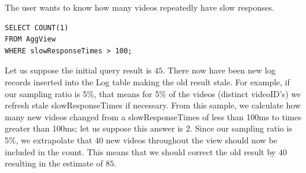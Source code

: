 The user wants to know how many videos repeatedly have slow responses.
\begin{lstlisting} 
SELECT COUNT(1)
FROM AggView
WHERE slowResponseTimes > 100;
\end{lstlisting}
Let us suppose the initial query result is $45$.
There now have been new log records inserted into the Log table making the old result stale.
For example, if our sampling ratio is 5\%, that means for 5\% of the videos (distinct videoID's) we refresh stale slowResponseTimes if necessary.
From this sample, we calculate how many new videos changed from a slowResponseTimes of less than 100ms to times greater than 100ms; let us suppose this answer is $2$.
Since our sampling ratio is 5\%, we extrapolate that $40$ new videos throughout the view should now be included in the count.
This means that we should correct the old result by $40$ resulting in the estimate of $85$.